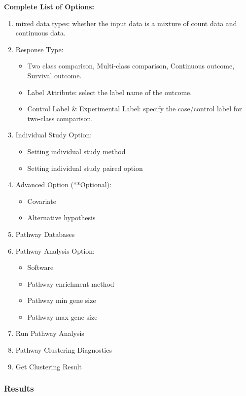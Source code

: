 \textbf{Complete List of Options:} 

\begin{enumerate}
  \item mixed data types: whether the input data is a mixture of count data and continuous data.
  \item Response Type:
   \begin{itemize}
     \item Two class comparison, Multi-class comparison, Continuous outcome, Survival outcome.
     \item Label Attribute: select the label name of the outcome.
     \item Control Label \& Experimental Label: specify the case/control label for two-class comparison.
    \end{itemize}
   \item Individual Study Option:
     \begin{itemize}
     \item Setting individual study method
     \item Setting individual study paired option
    \end{itemize} 
   \item Advanced Option (**Optional):
     \begin{itemize}
      \item Covariate
      \item Alternative hypothesis
    \end{itemize} 
    \item Pathway Databases
    \item Pathway Analysis Option:
         \begin{itemize}
       \item Software
      \item Pathway enrichment method
      \item Pathway min gene size
      \item Pathway max gene size
    \end{itemize} 
    \item Run Pathway Analysis
    \item Pathway Clustering Diagnostics
    \item Get Clustering Result
\end{enumerate}


\subsubsection{Results}

